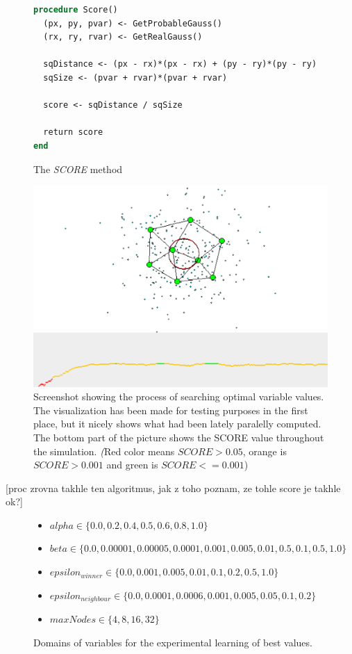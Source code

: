 \begin{figure}
\begin{lstlisting}[language=Pascal]
procedure Score()
  (px, py, pvar) <- GetProbableGauss()
  (rx, ry, rvar) <- GetRealGauss()
  
  sqDistance <- (px - rx)*(px - rx) + (py - ry)*(py - ry)
  sqSize <- (pvar + rvar)*(pvar + rvar)
  
  score <- sqDistance / sqSize
  
  return score
end
\end{lstlisting}       
\caption{The \emph{SCORE} method}
\label{usedalgo:scoremethod}
\end{figure}
       
\begin{figure}      
\begin{center}
\includegraphics[scale=0.75]{images/gng/experimental_setup.eps}    
\caption{Screenshot showing the process of searching optimal variable values. The visualization has been made for testing purposes in the first place, but it nicely shows what had been lately paralelly computed. The bottom part of the picture shows the SCORE value throughout the simulation. {\emph (Red color means $SCORE > 0.05$, orange is $SCORE > 0.001$ and green is $SCORE <= 0.001$)} }
\end{center}                          
\label{usedalgo:gngexperimentscreen}
\end{figure}
[proc zrovna takhle ten algoritmus, jak z toho poznam, ze tohle score je takhle ok?]
\begin{figure}          
\begin{itemize}
\item $alpha \in \{0.0, 0.2, 0.4, 0.5, 0.6, 0.8, 1.0\}$
\item $beta \in \{0.0, 0.00001, 0.00005, 0.0001, 0.001, 0.005, 0.01, 0.5, 0.1, 0.5, 1.0\}$
\item $epsilon_{winner} \in \{0.0, 0.001, 0.005, 0.01, 0.1, 0.2, 0.5, 1.0\}$
\item $epsilon_{neighbour} \in \{0.0, 0.0001, 0.0006, 0.001, 0.005, 0.05, 0.1, 0.2\}$
\item $maxNodes \in \{4, 8, 16, 32\}$
\end{itemize}
\caption{Domains of variables for the experimental learning of best values.}
\label{usedalgo:gngexperimentdomains}
\end{figure}

